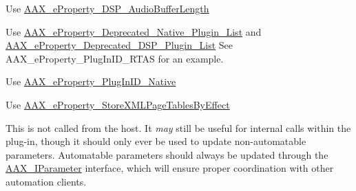 \begin{DoxyRefList}
\item[Member \mbox{\hyperlink{a00662_a13e384f22825afd3db6d68395b79ce0da34b1ae8c8edd3080aee6cd677bed9611}{A\+A\+X\+\_\+e\+Property\+\_\+\+Audio\+Buffer\+Length}} ]\label{a00788__deprecated000017}%
%
Use \mbox{\hyperlink{a00662_a13e384f22825afd3db6d68395b79ce0da09fbd1cbcae0e86ad81005258dc1b67e}{A\+A\+X\+\_\+e\+Property\+\_\+\+D\+S\+P\+\_\+\+Audio\+Buffer\+Length}}  
\item[Member \mbox{\hyperlink{a00662_a13e384f22825afd3db6d68395b79ce0da2414ef0c66df40f47ec8f8092de3b94a}{A\+A\+X\+\_\+e\+Property\+\_\+\+Deprecated\+\_\+\+Plugin\+\_\+\+List}} ]\label{a00788__deprecated000016}%
%
Use \mbox{\hyperlink{a00662_a13e384f22825afd3db6d68395b79ce0da3f1e690c987d601001a7cc1da8247399}{A\+A\+X\+\_\+e\+Property\+\_\+\+Deprecated\+\_\+\+Native\+\_\+\+Plugin\+\_\+\+List}} and \mbox{\hyperlink{a00662_a13e384f22825afd3db6d68395b79ce0dab102bc794f2770c14b1f0fe2dde6766a}{A\+A\+X\+\_\+e\+Property\+\_\+\+Deprecated\+\_\+\+D\+S\+P\+\_\+\+Plugin\+\_\+\+List}} See A\+A\+X\+\_\+e\+Property\+\_\+\+Plug\+In\+I\+D\+\_\+\+R\+T\+AS for an example.  
\item[Member \mbox{\hyperlink{a00662_a13e384f22825afd3db6d68395b79ce0da01880753b83fc0a40d99a5381301a9cf}{A\+A\+X\+\_\+e\+Property\+\_\+\+Plug\+In\+I\+D\+\_\+\+R\+T\+AS}} ]\label{a00788__deprecated000015}%
%
Use \mbox{\hyperlink{a00662_a13e384f22825afd3db6d68395b79ce0da89ca3dd6e96895cda14976c1b1ceb826}{A\+A\+X\+\_\+e\+Property\+\_\+\+Plug\+In\+I\+D\+\_\+\+Native}}  
\item[Member \mbox{\hyperlink{a00662_a13e384f22825afd3db6d68395b79ce0dae555ac90959bcee0301eed22dff52b03}{A\+A\+X\+\_\+e\+Property\+\_\+\+Store\+X\+M\+L\+Page\+Tables\+By\+Type}} ]\label{a00788__deprecated000018}%
%
Use \mbox{\hyperlink{a00662_a13e384f22825afd3db6d68395b79ce0da1837e77c3a427004ac44714a8c9cbad9}{A\+A\+X\+\_\+e\+Property\+\_\+\+Store\+X\+M\+L\+Page\+Tables\+By\+Effect}}  
\item[Member \mbox{\hyperlink{a01669_a54403bec090fcc999a93f54c01bca0c9}{A\+A\+X\+\_\+\+I\+A\+C\+F\+Effect\+Parameters::Update\+Parameter\+Normalized\+Relative}} (A\+A\+X\+\_\+\+C\+Param\+ID i\+Parameter\+ID, double i\+Value)=0]\label{a00788__deprecated000013}%
%
This is not called from the host. It {\itshape may} still be useful for internal calls within the plug-\/in, though it should only ever be used to update non-\/automatable parameters. Automatable parameters should always be updated through the \mbox{\hyperlink{a01857}{A\+A\+X\+\_\+\+I\+Parameter}} interface, which will ensure proper coordination with other automation clients. 

\end{DoxyRefList}
